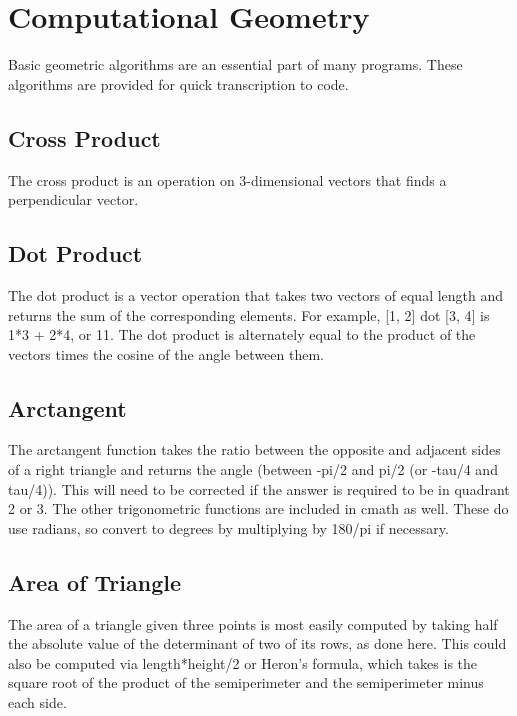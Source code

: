 \section{Computational Geometry}
Basic geometric algorithms are an essential part of many programs. These algorithms are provided for quick transcription to code.

\subsection{Cross Product}
The cross product is an operation on 3-dimensional vectors that finds a perpendicular vector.


\subsection{Dot Product}
The dot product is a vector operation that takes two vectors of equal length and returns the sum of the corresponding elements. For example, [1, 2] dot [3, 4] is 1*3 + 2*4, or 11. The dot product is alternately equal to the product of the vectors times the cosine of the angle between them.


\subsection{Arctangent}
The arctangent function takes the ratio between the opposite and adjacent sides of a right triangle and returns the angle (between -pi/2 and pi/2 (or -tau/4 and tau/4)). This will need to be corrected if the answer is required to be in quadrant 2 or 3. The other trigonometric functions are included in cmath as well. These do use radians, so convert to degrees by multiplying by 180/pi if necessary.


\subsection{Area of Triangle}
The area of a triangle given three points is most easily computed by taking half the absolute value of the determinant of two of its rows, as done here. This could also be computed via length*height/2 or Heron's formula, which takes is the square root of the product of the semiperimeter and the semiperimeter minus each side.


